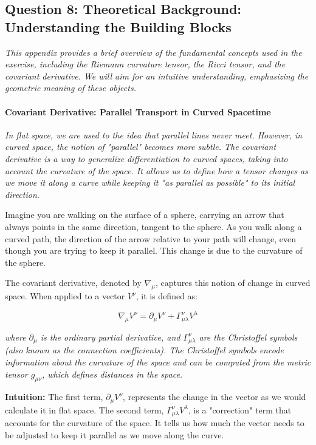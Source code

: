 \subsection*{Question 8: Theoretical Background: Understanding the Building Blocks}

\textit{This appendix provides a brief overview of the fundamental concepts used in the exercise, including the Riemann curvature tensor, the Ricci tensor, and the covariant derivative. We will aim for an intuitive understanding, emphasizing the geometric meaning of these objects.}

\paragraph{Covariant Derivative: Parallel Transport in Curved Spacetime}

\textit{In flat space, we are used to the idea that parallel lines never meet. However, in curved space, the notion of "parallel" becomes more subtle. The covariant derivative is a way to generalize differentiation to curved spaces, taking into account the curvature of the space. It allows us to define how a tensor changes as we move it along a curve while keeping it "as parallel as possible" to its initial direction.}

Imagine you are walking on the surface of a sphere, carrying an arrow that always points in the same direction, tangent to the sphere. As you walk along a curved path, the direction of the arrow relative to your path will change, even though you are trying to keep it parallel. This change is due to the curvature of the sphere.

The covariant derivative, denoted by \(\nabla_{\mu}\), captures this notion of change in curved space. When applied to a vector \(V^\nu\), it is defined as:

\[
\nabla_{\mu} V^\nu = \partial_{\mu} V^\nu + \Gamma^\nu_{\mu\lambda} V^\lambda
\]

\textit{where \(\partial_{\mu}\) is the ordinary partial derivative, and \(\Gamma^\nu_{\mu\lambda}\) are the Christoffel symbols (also known as the connection coefficients). The Christoffel symbols encode information about the curvature of the space and can be computed from the metric tensor \(g_{\mu\nu}\), which defines distances in the space.}

\textbf{Intuition:} The first term, \(\partial_{\mu} V^\nu\), represents the change in the vector as we would calculate it in flat space. The second term, \(\Gamma^\nu_{\mu\lambda} V^\lambda\), is a "correction" term that accounts for the curvature of the space. It tells us how much the vector needs to be adjusted to keep it parallel as we move along the curve.

